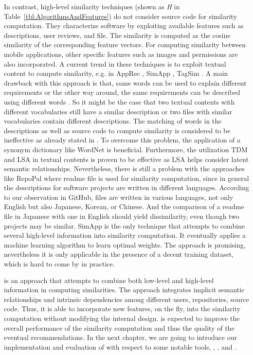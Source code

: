 In contrast, high-level similarity techniques (shown as \textit{H} in Table~\ref{tbl:AlgorithmsAndFeatures}) do not consider source code for similarity computation. They characterize software by exploiting available features such as descriptions, user reviews, and  file. The similarity is computed as the cosine similarity of the corresponding feature vectors. For computing similarity between mobile applications, other specific features such as images and permissions are also incorporated. A current trend in these techniques is to exploit textual content to compute similarity, e.g. in AppRec \cite{confairsBhandariSDJ13}, SimApp \cite{Chen:2015:SFD:2684822.2685305}, TagSim \cite{Lo:2012:DSA:2473496.2473616}. A main drawback with this approach is that, same words can be used to explain different requirements or the other way around, the same requirements can be described using different words \cite{10.1109/APSEC.2004.69}. So it might be the case that two textual contents with different vocabularies still have a similar description or two files with similar vocabularies contain different descriptions. The matching of words in the descriptions as well as source code to compute similarity is considered to be ineffective as already stated in \cite{McMillan:2012:DSS:2337223.2337267}. To overcome this problem, the application of a synonym dictionary like WordNet \cite{Miller:1995:WLD:219717.219748} is beneficial. Furthermore, the utilization TDM and LSA in textual contents is proven to be effective as LSA helps consider latent semantic relationships. Nevertheless, there is still a problem with the approaches like RepoPal where readme file is used for similarity computation, since in general the descriptions for software projects are written in different languages. According to our observation in GitHub,  files are written in various languages, \eg not only English but also Japanese, Korean, or Chinese. And the comparison of a readme file in Japanese with one in English should yield dissimilarity, even though two projects may be similar. SimApp \cite{Chen:2015:SFD:2684822.2685305} is the only technique that attempts to combine several high-level information into similarity computation. It eventually applies a machine learning algorithm to learn optimal weights. The approach is promising, nevertheless it is only applicable in the presence of a decent training dataset, which is hard to come by in practice.

\CrossSim is an approach that attempts to combine both low-level and high-level information in computing similarities. The approach integrates implicit semantic relationships and intrinsic dependencies among different users, repositories, source code. Thus, it is able to incorporate new features, on the fly, into the similarity computation without modifying the internal design. \CrossSim is expected to improve the overall performance of the similarity computation and thus the quality of the eventual recommendations. In the next chapter, we are going to introduce our implementation and evaluation of \CrossSim with respect to some notable tools, \ie \MUDABlue, \CLAN, and \RepoPal.


